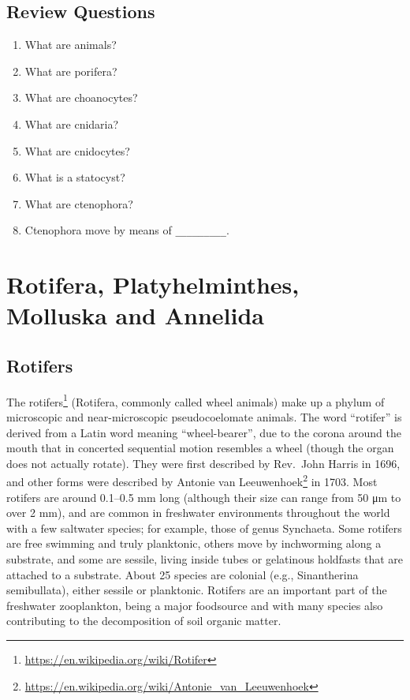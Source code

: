 \documentclass[]{book}
\providecommand{\tightlist}{%
  \setlength{\itemsep}{0pt}\setlength{\parskip}{0pt}}
\let\rmarkdownfootnote\footnote%
\def\footnote{\protect\rmarkdownfootnote}
\renewcommand{\href}[2]{#2\footnote{\url{#1}}}
\theoremstyle{definition}
\theoremstyle{definition}
\theoremstyle{definition}
\theoremstyle{remark}
\begin{document}
\section{Review Questions}\label{review-questions-3}

\begin{enumerate}
\def\labelenumi{\arabic{enumi}.}
\tightlist
\item
  What are animals?
\item
  What are porifera?
\item
  What are choanocytes?
\item
  What are cnidaria?
\item
  What are cnidocytes?
\item
  What is a statocyst?
\item
  What are ctenophora?
\item
  Ctenophora move by means of \texttt{\_\_\_\_\_\_\_\_\_}.
\end{enumerate}

\chapter{Rotifera, Platyhelminthes, Molluska and
Annelida}\label{rotifera-platyhelminthes-molluska-and-annelida}

\section{Rotifers}\label{rotifers}

The \href{https://en.wikipedia.org/wiki/Rotifer}{rotifers} (Rotifera,
commonly called wheel animals) make up a phylum of microscopic and
near-microscopic pseudocoelomate animals. The word ``rotifer'' is
derived from a Latin word meaning ``wheel-bearer'', due to the corona
around the mouth that in concerted sequential motion resembles a wheel
(though the organ does not actually rotate). They were first described
by Rev.~John Harris in 1696, and other forms were described by \href{https://en.wikipedia.org/wiki/Antonie_van_Leeuwenhoek}{Antonie
van Leeuwenhoek} in 1703. Most rotifers are around 0.1--0.5 mm long
(although their size can range from 50 μm to over 2 mm), and are common
in freshwater environments throughout the world with a few saltwater
species; for example, those of genus Synchaeta. Some rotifers are free
swimming and truly planktonic, others move by inchworming along a
substrate, and some are sessile, living inside tubes or gelatinous
holdfasts that are attached to a substrate. About 25 species are
colonial (e.g., Sinantherina semibullata), either sessile or planktonic.
Rotifers are an important part of the freshwater zooplankton, being a
major foodsource and with many species also contributing to the
decomposition of soil organic matter.
\end{document}
